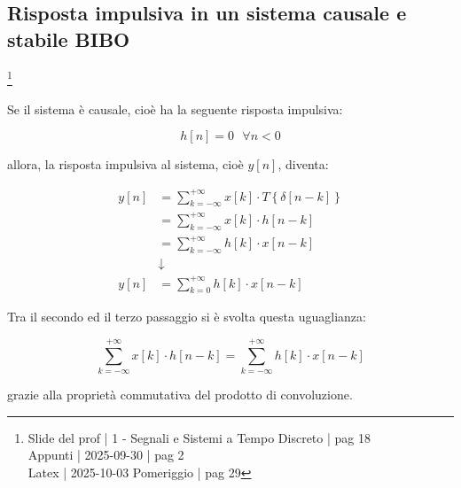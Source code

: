 \newpage 

\subsection{Risposta impulsiva in un sistema causale e stabile BIBO}

\footnote{ 
    Slide del prof | 1 - Segnali e Sistemi a Tempo Discreto | pag 18\\
    Appunti | 2025-09-30 | pag 2 \\ 
    Latex | 2025-10-03 Pomeriggio | pag 29
}

Se il sistema è causale, cioè ha la seguente risposta impulsiva: 

{
    \Large 
    \begin{equation}
        h \left[ n\right] = 0 \text{ } \forall n < 0
    \end{equation}
}

allora, la risposta impulsiva al sistema, cioè $y [n]$, diventa: 

{
    \Large 
    \begin{equation}
        \begin{split}
        y \left[ n\right]
        &= 
        \sum_{k = - \infty}^{+ \infty}
        x \left[ k\right]
        \cdot 
        T \left\{ \delta \left[ n - k\right]\right\}
        \\
        &=  
        \sum_{k = - \infty}^{+ \infty}
        x \left[ k\right]
        \cdot 
        h \left[n - k\right]
        \\
        &= 
        \sum_{k = - \infty}^{+ \infty}
        h \left[ k\right]
        \cdot 
        x \left[n - k\right]
        \\
        &\downarrow
        \\
        y \left[ n\right]
        &= 
        \sum_{k = 0}^{+ \infty}
        h \left[ k\right]
        \cdot 
        x \left[n - k\right]
    \end{split}
    \end{equation}
}

\begin{tcolorbox}
    Tra il secondo ed il terzo passaggio si è svolta questa uguaglianza: 

    {
        \Large 
        \begin{equation}
        \sum_{k = - \infty}^{+ \infty}
        x \left[ k\right]
        \cdot 
        h \left[n - k\right]
        = 
        \sum_{k = - \infty}^{+ \infty}
        h \left[ k\right]
        \cdot 
        x \left[n - k\right]    
        \end{equation}
    }

    grazie alla proprietà commutativa del prodotto di convoluzione. 
\end{tcolorbox}

